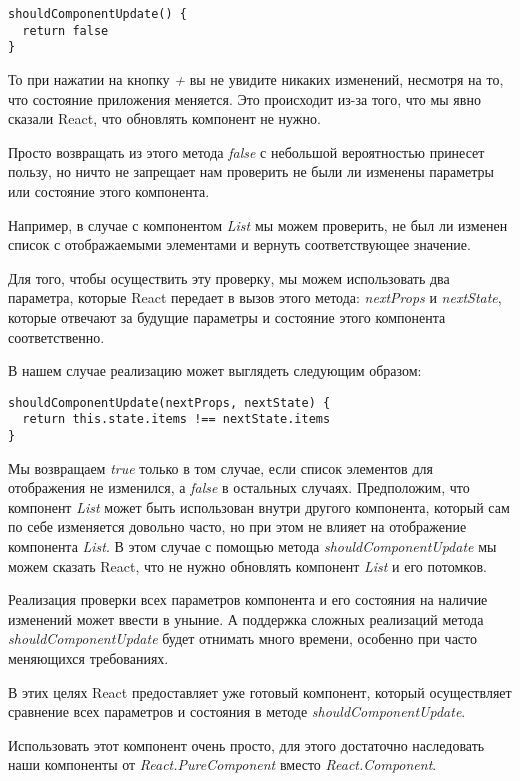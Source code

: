 \begin{lstlisting}
shouldComponentUpdate() {
  return false
}
\end{lstlisting}

То при нажатии на кнопку \textit{+} вы не увидите никаких изменений, несмотря на то, что состояние приложения меняется. Это происходит из-за того, что мы явно сказали React, что обновлять компонент не нужно.

Просто возвращать из этого метода \textit{false} с небольшой вероятностью принесет пользу, но ничто не запрещает нам проверить не были ли изменены параметры или состояние этого компонента.

Например, в случае с компонентом \textit{List} мы можем проверить, не был ли изменен список с отображаемыми элементами и вернуть соответствующее значение.

Для того, чтобы осуществить эту проверку, мы можем использовать два параметра, которые React передает в вызов этого метода: \textit{nextProps} и \textit{nextState}, которые отвечают за будущие параметры и состояние этого компонента соответственно.

В нашем случае реализацию может выглядеть следующим образом:

\begin{lstlisting}
shouldComponentUpdate(nextProps, nextState) {
  return this.state.items !== nextState.items
}
\end{lstlisting}

Мы возвращаем \textit{true} только в том случае, если список элементов для отображения не изменился, а \textit{false} в остальных случаях. Предположим, что компонент \textit{List} может быть использован внутри другого компонента, который сам по себе изменяется довольно часто, но при этом не влияет на отображение компонента \textit{List}. В этом случае с помощью метода \textit{shouldComponentUpdate} мы можем сказать React, что не нужно обновлять компонент \textit{List} и его потомков.

Реализация проверки всех параметров компонента и его состояния на наличие изменений может ввести в уныние. А поддержка сложных реализаций метода \textit{shouldComponentUpdate} будет отнимать много времени, особенно при часто меняющихся требованиях.

В этих целях React предоставляет уже готовый компонент, который осуществляет сравнение всех параметров и состояния в методе \textit{shouldComponentUpdate}.

Использовать этот компонент очень просто, для этого достаточно наследовать наши компоненты от \textit{React.PureComponent} вместо \textit{React.Component}.

